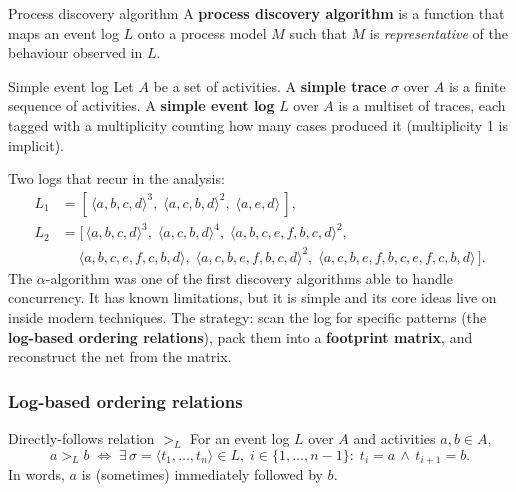 \begin{definitionbox}{Process discovery algorithm}
A \textbf{process discovery algorithm} is a function that maps an event log $L$ onto a process model $M$ such that $M$ is \emph{representative} of the behaviour observed in $L$.
\end{definitionbox}

\begin{definitionbox}{Simple event log}
Let $A$ be a set of activities. A \textbf{simple trace} $\sigma$ over $A$ is a finite sequence of activities. A \textbf{simple event log} $L$ over $A$ is a multiset of traces, each tagged with a multiplicity counting how many cases produced it (multiplicity 1 is implicit).
\end{definitionbox}

Two logs that recur in the analysis:
\begin{align*}
L_1 &= [\,\langle a, b, c, d\rangle^3,\;\langle a, c, b, d\rangle^2,\;\langle a, e, d\rangle\,], \\
L_2 &= [\,\langle a, b, c, d\rangle^3,\;\langle a, c, b, d\rangle^4,\;\langle a, b, c, e, f, b, c, d\rangle^2,\;\\
     &\quad\;\langle a, b, c, e, f, c, b, d\rangle,\;\langle a, c, b, e, f, b, c, d\rangle^2,\;\langle a, c, b, e, f, b, c, e, f, c, b, d\rangle\,].
\end{align*}
The $\alpha$-algorithm was one of the first discovery algorithms able to handle concurrency. It has known limitations, but it is simple and its core ideas live on inside modern techniques. The strategy: scan the log for specific patterns (the \textbf{log-based ordering relations}), pack them into a \textbf{footprint matrix}, and reconstruct the net from the matrix.

\subsubsection{Log-based ordering relations}

\begin{definitionbox}{Directly-follows relation $>_L$}
For an event log $L$ over $A$ and activities $a, b \in A$,
\[
  a >_L b \;\Longleftrightarrow\; \exists\, \sigma = \langle t_1, \dots, t_n\rangle \in L,\; i \in \{1, \dots, n-1\}:\; t_i = a \,\wedge\, t_{i+1} = b.
\]
In words, $a$ is (sometimes) immediately followed by $b$.
\end{definitionbox}

